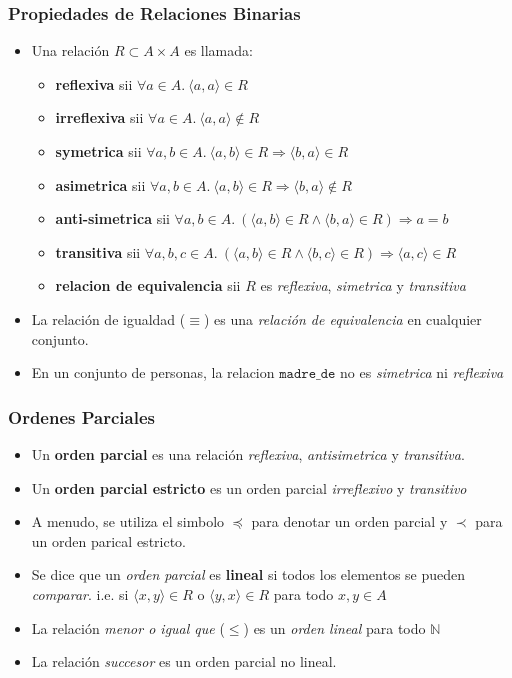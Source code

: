 \documentclass{beamer}
\begin{document}
\begin{frame}
    \frametitle{Propiedades de Relaciones Binarias}
    \begin{itemize}
        \item{
            Una relaci\'on $R\subset A\times A$ es llamada:
            \begin{itemize}
                \item{{\bf reflexiva} sii $\forall a \in A.\ \langle a,a \rangle \in R$}
                \item{{\bf irreflexiva} sii $\forall a \in A.\ \langle a,a\rangle \notin R$}
                \item{{\bf symetrica} sii $\forall a,b \in A.\ \langle a,b\rangle \in R \Rightarrow \langle b,a \rangle \in R$}
                \item{{\bf asimetrica} sii $\forall a,b \in A.\ \langle a,b\rangle \in R \Rightarrow \langle b,a \rangle \notin R$}
                \item{{\bf anti-simetrica} sii $\forall a,b\in A.\ (\langle a,b \rangle \in R \wedge \langle b,a \rangle \in R)\Rightarrow a=b$}
                \item{{\bf transitiva} sii $\forall a,b,c \in A.\ (\langle a,b\rangle \in R\wedge \langle b,c\rangle \in R)\Rightarrow \langle a,c\rangle \in R$}
                \item{{\bf relacion de equivalencia} sii $R$ es \emph{reflexiva}, \emph{simetrica} y \emph{transitiva}}
            \end{itemize}
        }
        \item{La relaci\'on de igualdad ($\equiv$) es una \emph{relaci\'on de equivalencia}
        en cualquier conjunto.}
        \item{En un conjunto de personas, la relacion $\mathtt{madre\_de}$ no
        es \emph{simetrica} ni \emph{reflexiva}}
    \end{itemize}
\end{frame}

\begin{frame}
\frametitle{Ordenes Parciales}
\begin{itemize}
    \item{Un {\bf orden parcial} es una relaci\'on \emph{reflexiva}, \emph{antisimetrica} y
    \emph{transitiva}.}
    \item{Un {\bf orden parcial estricto} es un orden parcial \emph{irreflexivo} y \emph{transitivo}}
    \item{A menudo, se utiliza el simbolo $\preceq$ para denotar un orden parcial
    y $\prec$ para un orden parical estricto.}
    \item{Se dice que un \emph{orden parcial} es {\bf lineal} si todos los
    elementos se pueden \emph{comparar}. i.e. si $\langle x,y \rangle \in R$ o
    $\langle y,x \rangle \in R$ para todo $x,y \in A$}
    \item{La relaci\'on \emph{menor o igual que} ($\leq$) es un \emph{orden lineal}
    para todo $\mathbb{N}$}
    \item{La relaci\'on \emph{succesor} es un orden parcial no lineal.}
\end{itemize}
\end{frame}
\end{document}
